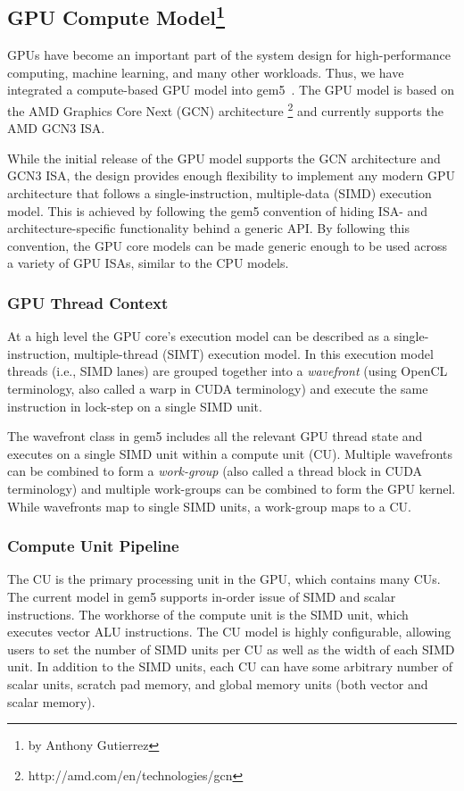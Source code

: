 \subsection[GPU Compute Model]{GPU Compute Model\footnote{by Anthony Gutierrez}}
\label{sec:gpu}

GPUs have become an important part of the system design for high-performance
computing, machine learning, and many other workloads. Thus, we have integrated
a compute-based GPU model into gem5~\cite{GutierrezBeckmann2018-amdAPU}. The
GPU model is based on the AMD Graphics Core Next (GCN) architecture
\footnote{http://amd.com/en/technologies/gcn} and currently
supports the AMD GCN3 ISA.

While the initial release of the GPU model supports the GCN architecture and
GCN3 ISA, the design provides enough flexibility to implement any
modern GPU architecture that follows a single-instruction, multiple-data
(SIMD) execution model. This is achieved by following the gem5
convention of hiding ISA- and architecture-specific functionality behind a
generic API. By following this convention, the GPU core models
can be made generic enough to be used across a variety of GPU ISAs, similar
to the CPU models.

\subsubsection[GPU Thread Context]{GPU Thread Context}
At a high level the GPU core's execution model can be described as a
single-instruction, multiple-thread (SIMT) execution model. In
this execution model threads (i.e., SIMD lanes) are grouped together into
a \textit{wavefront}
(using OpenCL terminology, also called a warp in CUDA terminology) and execute the
same instruction in lock-step on a single SIMD unit.

The wavefront class in gem5 includes all the relevant GPU thread state and
executes on a single SIMD unit within a compute unit (CU). Multiple wavefronts
can be combined to form a \textit{work-group} (also called
a thread block in CUDA terminology) and multiple work-groups can be combined to
form the GPU kernel. While wavefronts map to single SIMD units, a work-group maps
to a CU.

\subsubsection[Compute Unit Pipeline]{Compute Unit Pipeline}
The CU is the primary processing unit in the GPU, which contains many
CUs. The current model in gem5 supports in-order issue of SIMD and scalar
instructions.
The workhorse of the compute unit is the SIMD unit, which executes vector
ALU instructions. The CU model is highly configurable, allowing users to set the
number of SIMD units per CU as well as the width of each SIMD unit. In addition to
the SIMD units, each CU can have some arbitrary number of scalar units, scratch
pad memory, and global memory units (both vector and scalar memory).

